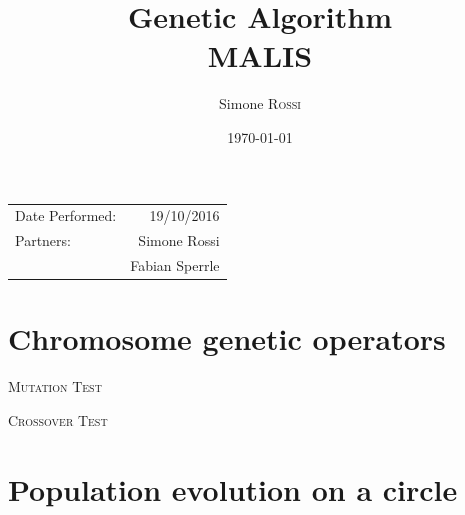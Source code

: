 \documentclass{article}
\title{Genetic Algorithm\\MALIS} %
\author{Simone \textsc{Rossi}} %
\date{\today} %
\begin{document}
\maketitle %

\begin{center}
\begin{tabular}{l r}
Date Performed: & 19/10/2016 \\ %
Partners: & Simone Rossi \\ %
          & Fabian Sperrle\\
\end{tabular}
\end{center}



\section{Chromosome genetic operators}

\textsc{Mutation Test}

\newpage
\textsc{Crossover Test}


\section{Population evolution on a circle}

\end{document}
